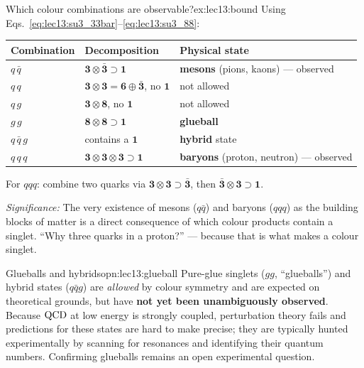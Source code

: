 \documentclass[../main.tex]{subfiles}
\begin{document}
\begin{Example}{Which colour combinations are observable?}{ex:lec13:bound}
Using Eqs.~\eqref{eq:lec13:su3_33bar}--\eqref{eq:lec13:su3_88}:
\begin{center}
\renewcommand{\arraystretch}{1.25}
\begin{tabular}{lll}
  \toprule
  Combination & Decomposition & Physical state \\
  \midrule
  $q\,\bar q$ & $\mathbf{3}\otimes\bar{\mathbf{3}}\supset\mathbf{1}$ & \textbf{mesons} (pions, kaons) --- observed \\
  $q\,q$ & $\mathbf{3}\otimes\mathbf{3}=\mathbf{6}\oplus\bar{\mathbf{3}}$, no $\mathbf{1}$ & not allowed \\
  $q\,g$ & $\mathbf{3}\otimes\mathbf{8}$, no $\mathbf{1}$ & not allowed \\
  $g\,g$ & $\mathbf{8}\otimes\mathbf{8}\supset\mathbf{1}$ & \textbf{glueball} \\
  $q\,\bar q\,g$ & contains a $\mathbf{1}$ & \textbf{hybrid} state \\
  $q\,q\,q$ & $\mathbf{3}\otimes\mathbf{3}\otimes\mathbf{3}\supset\mathbf{1}$ & \textbf{baryons} (proton, neutron) --- observed \\
  \bottomrule
\end{tabular}
\end{center}
For $qqq$: combine two quarks via $\mathbf{3}\otimes\mathbf{3}\supset\bar{\mathbf{3}}$, then $\bar{\mathbf{3}}\otimes\mathbf{3}\supset\mathbf{1}$.
\end{Example}

\textit{Significance:} The very existence of mesons ($q\bar q$) and baryons ($qqq$) as the building blocks of matter is a direct consequence of which colour products contain a singlet. ``Why three quarks in a proton?'' --- because that is what makes a colour singlet.

\begin{OpenQuestion}{Glueballs and hybrids}{opn:lec13:glueball}
Pure-glue singlets ($gg$, ``glueballs'') and hybrid states ($q\bar q g$) are \emph{allowed} by colour symmetry and are expected on theoretical grounds, but have \textbf{not yet been unambiguously observed}. Because $\mathrm{QCD}$ at low energy is strongly coupled, perturbation theory fails and predictions for these states are hard to make precise; they are typically hunted experimentally by scanning for resonances and identifying their quantum numbers. Confirming glueballs remains an open experimental question.
\end{OpenQuestion}
\end{document}
